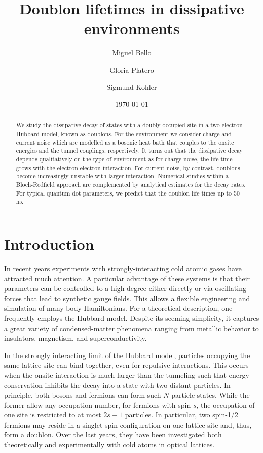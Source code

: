 \documentclass[twocolumn,prb,showpacs]{revtex4-1}
\begin{document}
\title{Doublon lifetimes in dissipative environments}

\author{Miguel Bello}
\author{Gloria Platero}
\author{Sigmund Kohler}
\date{\today}


\begin{abstract}
We study the dissipative decay of states with a doubly occupied site in a
two-electron Hubbard model, known as doublons.  For the environment we
consider charge and current noise which are modelled as a bosonic
heat bath that couples to the onsite energies and the tunnel couplings,
respectively.  It turns out that the dissipative decay depends
qualitatively on the type of environment as for charge noise, the
life time grows with the electron-electron interaction.  For current noise,
by contrast, doublons become increasingly unstable with larger interaction.
Numerical studies within a Bloch-Redfield approach are complemented by
analytical estimates for the decay rates.  For typical quantum dot
parameters, we predict that the doublon life times up to 50\,ns.
\end{abstract}

\maketitle

\section{Introduction}

In recent years experiments with strongly-interacting cold atomic gases
have attracted much attention.\cite{ReviewBloch2008}  A particular
advantage of these systems is that their parameters can be controlled to a
high degree either directly or via oscillating forces that lead to
synthetic gauge fields.\cite{Creffield2011a, Dalibard2011a}  This allows a flexible
engineering and simulation of many-body Hamiltonians.  For a theoretical
description, one frequently employs the Hubbard model.  Despite its seeming
simplicity, it captures a great variety of condensed-matter phenomena
ranging from metallic behavior to insulators, magnetism, and
superconductivity.

In the strongly interacting limit of the Hubbard model, particles occupying
the same lattice site can bind together, even for repulsive interactions.
This occurs when the onsite interaction is much larger than the tunneling 
such that energy conservation inhibits the decay into a
state with two distant particles.  In principle, both bosons
\cite{Valiente2008, Compagno2017} and fermions \cite{BookEssler2005} can
form such $N$-particle states.  While the former allow any occupation
number, for fermions with spin $s$, the occupation of one site is
restricted to at most $2s+1$ particles. 
In particular, two spin-1/2 fermions may reside in a singlet spin 
configuration on one lattice site and, thus, form a doublon. Over the last 
years, they have been investigated both theoretically 
\cite{Hofmann2012, Bello2016, Bello2017a} and experimentally 
\cite{Winkler2006, Folling2007, Strohmaier2010, Preiss2015} 
with cold atoms in optical lattices.
\end{document}
